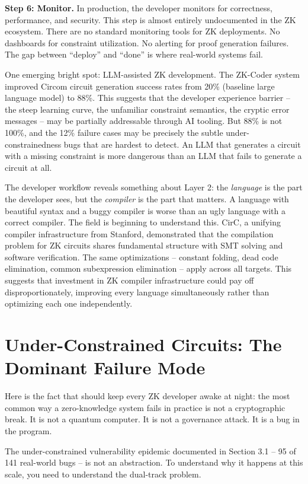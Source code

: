 \documentclass[
  11pt,
  openany]{report}
\renewcommand{\textbf}[1]{{\bfseries\color{MidnightBold}#1}}
\begin{document}
\textbf{Step 6: Monitor.} In production, the developer monitors for correctness,
performance, and security. This step is almost entirely undocumented in the ZK
ecosystem. There are no standard monitoring tools for ZK deployments. No
dashboards for constraint utilization. No alerting for proof generation
failures. The gap between ``deploy'' and ``done'' is where real-world systems
fail.

One emerging bright spot: LLM-assisted ZK development. The ZK-Coder system
improved Circom circuit generation success rates from 20\% (baseline large
language model) to 88\%. This suggests that the developer experience barrier --
the steep learning curve, the unfamiliar constraint semantics, the cryptic error
messages -- may be partially addressable through AI tooling. But 88\% is not
100\%, and the 12\% failure cases may be precisely the subtle
under-constrainedness bugs that are hardest to detect. An LLM that generates a
circuit with a missing constraint is more dangerous than an LLM that fails to
generate a circuit at all.

The developer workflow reveals something about Layer 2: the \emph{language} is
the part the developer sees, but the \emph{compiler} is the part that matters. A
language with beautiful syntax and a buggy compiler is worse than an ugly
language with a correct compiler. The field is beginning to understand this.
CirC, a unifying compiler infrastructure from Stanford, demonstrated that the
compilation problem for ZK circuits shares fundamental structure with SMT
solving and software verification. The same optimizations -- constant folding,
dead code elimination, common subexpression elimination -- apply across all
targets. This suggests that investment in ZK compiler infrastructure could pay
off disproportionately, improving every language simultaneously rather than
optimizing each one independently.

\section{Under-Constrained Circuits: The Dominant Failure
Mode}\label{under-constrained-circuits-the-dominant-failure-mode}

Here is the fact that should keep every ZK developer awake at night: the most
common way a zero-knowledge system fails in practice is not a cryptographic
break. It is not a quantum computer. It is not a governance attack. It is a bug
in the program.

The under-constrained vulnerability epidemic documented in Section 3.1 -- 95 of
141 real-world bugs -- is not an abstraction. To understand why it happens at
this scale, you need to understand the dual-track problem.
\end{document}
